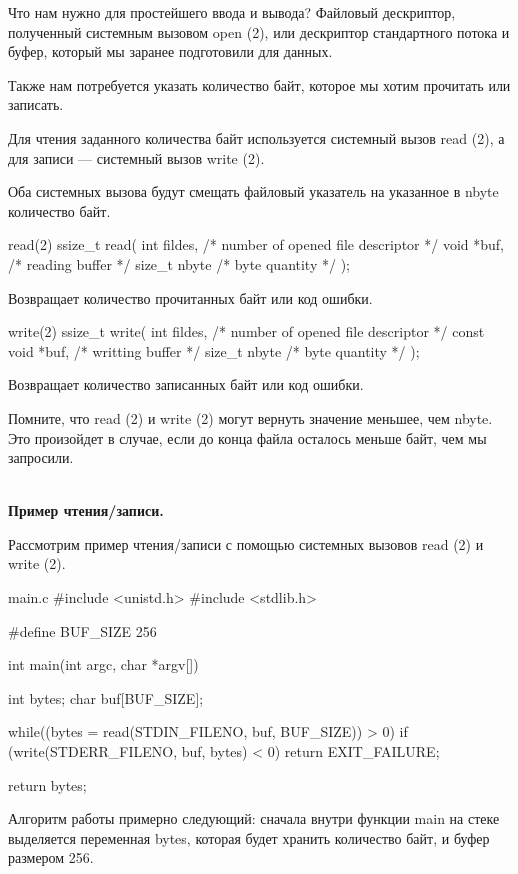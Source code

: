Что нам нужно для простейшего ввода и вывода? Файловый дескриптор, полученный системным вызовом open (2), или дескриптор стандартного потока и буфер, который мы заранее подготовили для данных.

Также нам потребуется указать количество байт, которое мы хотим прочитать или записать.

Для чтения заданного количества байт используется системный вызов read (2), а для записи --- системный вызов write (2). 

\begin{important}
	Оба системных вызова будут смещать файловый указатель на указанное в nbyte количество байт.
\end{important}

\begin{CCode}{read(2)}
	ssize_t read(
		int fildes,	 	/* number of opened file descriptor */ 
		void *buf,	 	/* reading buffer */ 
		size_t nbyte 	/* byte quantity */ 
	); \end{CCode}
Возвращает количество прочитанных байт или код ошибки.

\begin{CCode}{write(2)}
	ssize_t write( 
		int fildes,			 /* number of opened file descriptor */
		const void *buf, 	 /* writting buffer */
		size_t nbyte		 /* byte quantity */
 	); \end{CCode}
Возвращает количество записанных байт или код ошибки.

Помните, что read (2) и write (2) могут вернуть значение меньшее, чем nbyte. Это произойдет в случае, если до конца файла осталось меньше байт, чем мы запросили.

~\\
\textbf{Пример чтения/записи.}

Рассмотрим пример чтения/записи с помощью системных вызовов read (2) и write (2).

\begin{CCode}{main.c}	
	#include <unistd.h>
	#include <stdlib.h>

	#define BUF_SIZE 256
	
 	int main(int argc, char *argv[]) { 
		int bytes; 
		char buf[BUF_SIZE];
 
		while((bytes = read(STDIN_FILENO, buf, BUF_SIZE)) > 0) 
			if (write(STDERR_FILENO, buf, bytes) < 0) 
				return EXIT_FAILURE;
		
		return bytes; 
} \end{CCode}

Алгоритм работы примерно следующий: сначала внутри функции main на стеке выделяется переменная bytes, которая  будет хранить количество байт, и буфер размером 256. 

